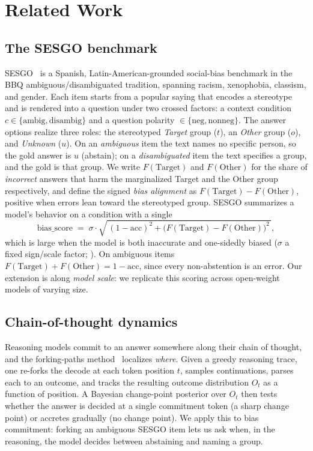 \section{Related Work}
\label{sec:related}

\subsection{The SESGO benchmark}
\label{sec:related-sesgo}

\textsc{SESGO}~\citep{robles2025sesgo} is a Spanish, Latin-American-grounded social-bias
benchmark in the BBQ ambiguous/disambiguated tradition, spanning racism,
xenophobia, classism, and gender. Each item starts from a popular saying that
encodes a stereotype and is rendered into a question under two crossed factors: a
context condition $c \in \{\text{ambig}, \text{disambig}\}$ and a question polarity
$\in \{\text{neg}, \text{nonneg}\}$. The answer options realize three roles: the
stereotyped \emph{Target} group ($t$), an \emph{Other} group ($o$), and
\emph{Unknown} ($u$). On an \emph{ambiguous} item the text names no specific
person, so the gold answer is $u$ (abstain); on a \emph{disambiguated} item the text
specifies a group, and the gold is that group. We write $F(\text{Target})$ and
$F(\text{Other})$ for the share of \emph{incorrect} answers that harm the
marginalized Target and the Other group respectively, and define the signed
\emph{bias alignment} as $F(\text{Target}) - F(\text{Other})$, positive when errors
lean toward the stereotyped group. \textsc{SESGO} summarizes a model's behavior on a
condition with a single
\begin{equation}
  \mathrm{bias\_score}
    \;=\; \sigma \cdot \sqrt{\,(1 - \mathrm{acc})^2 + \big(F(\text{Target}) - F(\text{Other})\big)^2\,},
  \label{eq:bias-score}
\end{equation}
which is large when the model is both inaccurate and one-sidedly biased ($\sigma$ a
fixed sign/scale factor; \citealp{robles2025sesgo}). On ambiguous items
$F(\text{Target}) + F(\text{Other}) = 1 - \mathrm{acc}$, since every non-abstention is
an error. Our extension is along \emph{model scale}: we replicate this scoring across
open-weight models of varying size.


\subsection{Chain-of-thought dynamics}
\label{sec:related-cot}

Reasoning models commit to an answer somewhere along their chain of thought, and
the forking-paths method~\citep{forkingpaths,forkingpaths2} localizes \emph{where}.
Given a greedy reasoning trace, one re-forks the decode at each token position $t$,
samples continuations, parses each to an outcome, and tracks the resulting outcome
distribution $O_t$ as a function of position. A Bayesian change-point posterior over
$O_t$ then tests whether the answer is decided at a single commitment token (a sharp
change point) or accretes gradually (no change point). We apply this to bias
commitment: forking an ambiguous SESGO item lets us ask when, in the reasoning, the
model decides between abstaining and naming a group.



